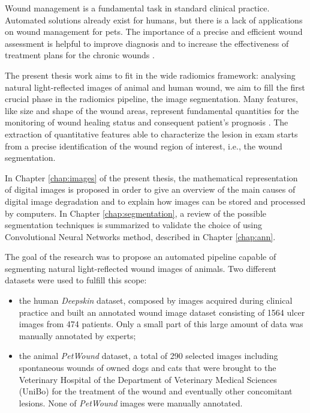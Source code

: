 \documentclass[../main.tex]{subfiles}
\begin{document}
Wound management is a fundamental task in standard clinical practice. 
Automated solutions already exist for humans, but there is a lack of applications on wound management for pets.
The importance of a precise and efficient wound assessment is helpful to improve diagnosis and to increase the effectiveness of treatment plans for the chronic wounds \cite{anisuzzaman2022image-wound-review}.

The present thesis work aims to fit in the wide radiomics framework: analysing natural light-reflected images of animal and human wound, we aim to fill the first crucial phase in the radiomics pipeline, the image segmentation.
Many features, like size and shape of the wound areas, represent fundamental quantities for the monitoring of wound healing status and consequent patient’s prognosis \cite{gethin2006importance-wound-measurement}.
The extraction of quantitative features able to characterize the lesion in exam starts from a precise identification of the wound region of interest, i.e., the wound segmentation.

In Chapter \ref{chap:images} of the present thesis, the mathematical representation of digital images is proposed in order to give an overview of the main causes of digital image degradation and to explain how images can be stored and processed by computers.
In Chapter \ref{chap:segmentation}, a review of the possible segmentation techniques is summarized to validate the choice of using Convolutional Neural Networks method, described in Chapter \ref{chap:ann}.

The goal of the research was to propose an automated pipeline capable of segmenting natural light-reflected wound images of animals. Two different datasets were used to fulfill this scope:  
\begin{itemize}
    \item the human \textit{Deepskin} dataset, composed by images acquired during clinical practice and built an annotated wound image dataset consisting of 1564 ulcer images from 474 patients.
    Only a small part of this large amount of data was manually annotated by experts; 
    \item the animal \textit{PetWound} dataset, a total of 290 selected images including spontaneous wounds of owned dogs and cats that were brought to the Veterinary Hospital of the Department of Veterinary Medical Sciences (UniBo) for the treatment of the wound and eventually other concomitant lesions.
    None of \textit{PetWound} images were manually annotated.
\end{itemize}
\end{document}
